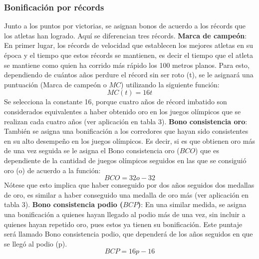 \documentclass[a4paper]{article}
\begin{document}
\subsubsection{Bonificación por récords}
Junto a los puntos por victorias, se asignan bonos de acuerdo a los récords que los atletas han logrado. Aquí se diferencian tres récords. \newline\newline \textbf{Marca de campeón}: En primer lugar, los récords de velocidad que establecen los mejores atletas en su época y el tiempo que estos récords se mantienen, es decir el tiempo que el atleta se mantiene como quien ha corrido más rápido los 100 metros planos. Para esto, dependiendo de cuántos años perdure el récord sin ser roto (t), se le asignará una puntuación (Marca de campeón o $MC$) utilizando la siguiente función: 
\begin{equation*}
    MC(t) =16t
\end{equation*}
Se selecciona la constante 16, porque cuatro años de récord imbatido son considerados equivalentes a haber obtenido oro en los juegos olímpicos que se realizan cada cuatro años (ver aplicación en tabla 3).  \newline\newline \textbf{Bono consistencia oro}: También se asigna una bonificación a los corredores que hayan sido consistentes en su alto desempeño en los juegos olímpicos. Es decir, si es que obtienen oro más de una vez seguida se le asigna el Bono consistencia oro ($BCO$) que es dependiente de la cantidad de juegos olímpicos seguidos en las que se consiguió oro (o) de acuerdo a la función:  
\begin{equation*}
    BCO = 32o - 32
\end{equation*}
Nótese que esto implica que haber conseguido por dos años seguidos dos medallas de oro, es similar a haber conseguido una medalla de oro más (ver aplicación en tabla 3). \newline\newline \textbf{Bono consistencia podio ($BCP$)}: En una similar medida, se asigna una bonificación a quienes hayan llegado al podio más de una vez, sin incluir a quienes hayan repetido oro, pues estos ya tienen su bonificación. Este puntaje será llamado Bono consistencia podio, que dependerá de los años seguidos en que se llegó al podio (p). 
\begin{equation*}
    BCP = 16p-16
\end{equation*}
\end{document}
